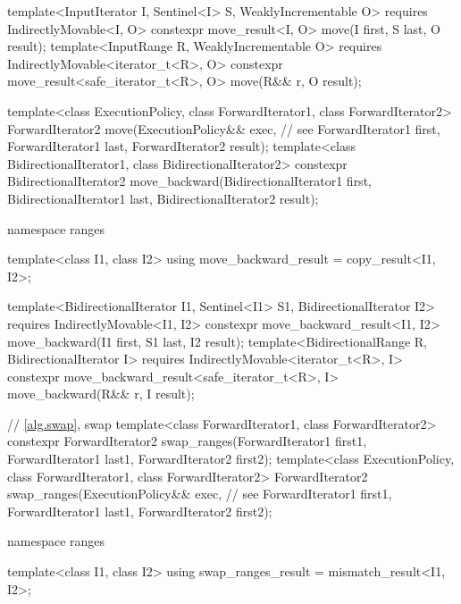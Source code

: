 \begin{addedblock}
\begin{codeblock}
{    template<InputIterator I, Sentinel<I> S, WeaklyIncrementable O>
      requires IndirectlyMovable<I, O>
      constexpr move_result<I, O>
        move(I first, S last, O result);
    template<InputRange R, WeaklyIncrementable O>
      requires IndirectlyMovable<iterator_t<R>, O>
      constexpr move_result<safe_iterator_t<R>, O>
        move(R&& r, O result);
  }
\end{codeblock}\end{addedblock}\begin{codeblock}
  template<class ExecutionPolicy, class ForwardIterator1,
           class ForwardIterator2>
    ForwardIterator2 move(ExecutionPolicy&& exec, // see 
                          ForwardIterator1 first, ForwardIterator1 last,
                          ForwardIterator2 result);
  template<class BidirectionalIterator1, class BidirectionalIterator2>
    constexpr BidirectionalIterator2
      move_backward(BidirectionalIterator1 first, BidirectionalIterator1 last,
                    BidirectionalIterator2 result);
\end{codeblock}\begin{addedblock}\begin{codeblock}
  namespace ranges {
    template<class I1, class I2>
    using move_backward_result = copy_result<I1, I2>;

    template<BidirectionalIterator I1, Sentinel<I1> S1, BidirectionalIterator I2>
      requires IndirectlyMovable<I1, I2>
      constexpr move_backward_result<I1, I2>
        move_backward(I1 first, S1 last, I2 result);
    template<BidirectionalRange R, BidirectionalIterator I>
      requires IndirectlyMovable<iterator_t<R>, I>
      constexpr move_backward_result<safe_iterator_t<R>, I>
        move_backward(R&& r, I result);
  }
\end{codeblock}\end{addedblock}\begin{codeblock}

  // \ref{alg.swap}, swap
  template<class ForwardIterator1, class ForwardIterator2>
    constexpr ForwardIterator2
      swap_ranges(ForwardIterator1 first1, ForwardIterator1 last1,
                  ForwardIterator2 first2);
  template<class ExecutionPolicy, class ForwardIterator1, class ForwardIterator2>
    ForwardIterator2
      swap_ranges(ExecutionPolicy&& exec, // see 
                  ForwardIterator1 first1, ForwardIterator1 last1,
                  ForwardIterator2 first2);
\end{codeblock}\begin{addedblock}\begin{codeblock}
  namespace ranges {
    template<class I1, class I2>
    using swap_ranges_result = mismatch_result<I1, I2>;

}
\end{codeblock}
\end{addedblock}
